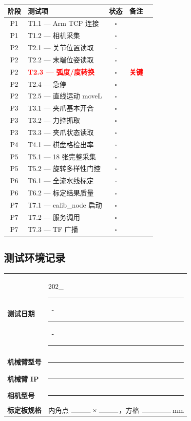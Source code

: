 \documentclass[12pt,a4paper,fontset=ubuntu]{ctexart}
\newcommand{\chkbox}{$\square$}
\begin{document}
\renewcommand{\arraystretch}{1.2}
\begin{center}
\begin{tabularx}{\textwidth}{@{}c>{\raggedright\arraybackslash}p{5.5cm}ccc@{}}
  \toprule
  \textbf{阶段} & \textbf{测试项} & \textbf{状态} & \textbf{备注} \\
  \midrule
  P1 & T1.1 — Arm TCP 连接 & \chkbox & \\
  P1 & T1.2 — 相机采集 & \chkbox & \\\addlinespace
  P2 & T2.1 — 关节位置读取 & \chkbox & \\
  P2 & T2.2 — 末端位姿读取 & \chkbox & \\
  P2 & \textbf{\textcolor{red}{T2.3 — 弧度/度转换}} & \chkbox & \textbf{\textcolor{red}{关键}} \\
  P2 & T2.4 — 急停 & \chkbox & \\
  P2 & T2.5 — 直线运动 moveL & \chkbox & \\\addlinespace
  P3 & T3.1 — 夹爪基本开合 & \chkbox & \\
  P3 & T3.2 — 力控抓取 & \chkbox & \\
  P3 & T3.3 — 夹爪状态读取 & \chkbox & \\\addlinespace
  P4 & T4.1 — 棋盘格检出率 & \chkbox & \\\addlinespace
  P5 & T5.1 — 18 张完整采集 & \chkbox & \\
  P5 & T5.2 — 旋转多样性门控 & \chkbox & \\\addlinespace
  P6 & T6.1 — 全流水线标定 & \chkbox & \\
  P6 & T6.2 — 标定结果质量 & \chkbox & \\\addlinespace
  P7 & T7.1 — calib\_node 启动 & \chkbox & \\
  P7 & T7.2 — 服务调用 & \chkbox & \\
  P7 & T7.3 — TF 广播 & \chkbox & \\
  \bottomrule
\end{tabularx}
\end{center}

\subsection{测试环境记录}

\begin{center}
\begin{tabularx}{\textwidth}{@{}>{\bfseries}lX@{}}
  \toprule
  测试日期 & 202\_\ \rule{1cm}{0.4pt}\ -\ \rule{1cm}{0.4pt}\ -\ \rule{1cm}{0.4pt} \\
  机械臂型号 & \rule{5cm}{0.4pt} \\
  机械臂 IP & \rule{5cm}{0.4pt} \\
  相机型号 & \rule{5cm}{0.4pt} \\
  标定板规格 & 内角点 $\rule{1cm}{0.4pt} \times \rule{1cm}{0.4pt}$，方格 $\rule{1.5cm}{0.4pt}$\,mm \\
  \bottomrule
\end{tabularx}
\end{center}
\end{document}
